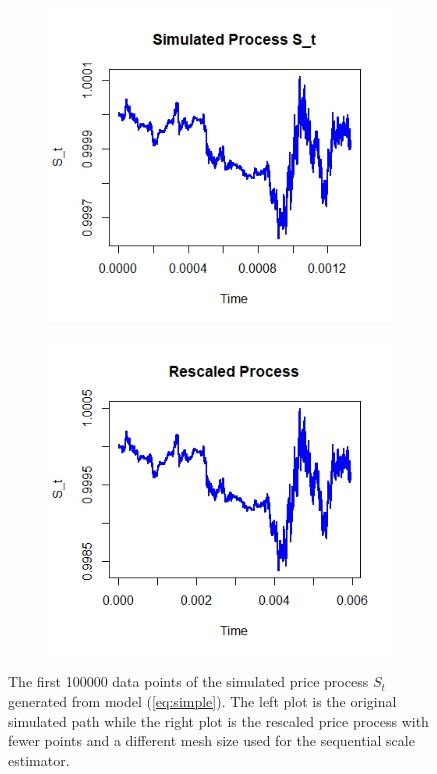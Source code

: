 \documentclass{article}
\begin{document}
\begin{figure}[htbp]
    \centering
    
    \begin{subfigure}{0.48\textwidth}
        \includegraphics[width=\linewidth]{price_plot.jpeg}
    \end{subfigure}
    \hfill
    \begin{subfigure}{0.48\textwidth}
        \includegraphics[width=\linewidth]{price_rescaled.jpeg}
    \end{subfigure}
    
    \caption{The first 100000 data points of the simulated price process $S_t$ generated from model (\ref{eq:simple}). The left plot is the original simulated path while the right plot is the rescaled price process with fewer points and a different mesh size used for the sequential scale estimator.}
    \label{fig:ex5price}
\end{figure}\\\\
\end{document}
